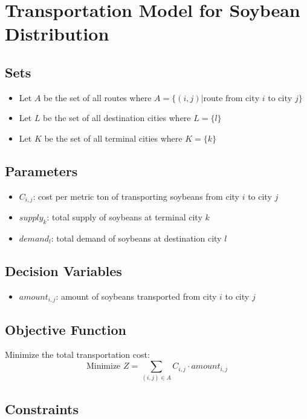 \documentclass{article}
\begin{document}
\section*{Transportation Model for Soybean Distribution}

\subsection*{Sets}
\begin{itemize}
    \item Let \( A \) be the set of all routes where \( A = \{(i,j) | \text{route from city } i \text{ to city } j\} \)
    \item Let \( L \) be the set of all destination cities where \( L = \{l\} \)
    \item Let \( K \) be the set of all terminal cities where \( K = \{k\} \)
\end{itemize}

\subsection*{Parameters}
\begin{itemize}
    \item \( C_{i,j} \): cost per metric ton of transporting soybeans from city \( i \) to city \( j \)
    \item \( supply_k \): total supply of soybeans at terminal city \( k \)
    \item \( demand_l \): total demand of soybeans at destination city \( l \)
\end{itemize}

\subsection*{Decision Variables}
\begin{itemize}
    \item \( amount_{i,j} \): amount of soybeans transported from city \( i \) to city \( j \)
\end{itemize}

\subsection*{Objective Function}
Minimize the total transportation cost:
\[
\text{Minimize } Z = \sum_{(i,j) \in A} C_{i,j} \cdot amount_{i,j}
\]

\subsection*{Constraints}
\end{document}
